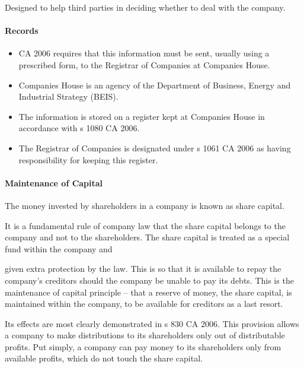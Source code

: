 \documentclass[
]{article}
\newenvironment{Shaded}{}{}
\newcommand{\NormalTok}[1]{#1}
\providecommand{\tightlist}{%
  \setlength{\itemsep}{0pt}\setlength{\parskip}{0pt}}
\begin{document}
Designed to help third parties in deciding whether to deal with the
company.

\hypertarget{records}{%
\paragraph{Records}\label{records}}

\begin{itemize}
\tightlist
\item
  CA 2006 requires that this information must be sent, usually using a
  prescribed form, to the Registrar of Companies at Companies House.
\item
  Companies House is an agency of the Department of Business, Energy and
  Industrial Strategy (BEIS).
\item
  The information is stored on a register kept at Companies House in
  accordance with s 1080 CA 2006.
\item
  The Registrar of Companies is designated under s 1061 CA 2006 as
  having responsibility for keeping this register.
\end{itemize}

\hypertarget{maintenance-of-capital}{%
\paragraph{Maintenance of Capital}\label{maintenance-of-capital}}

\begin{Shaded}
\begin{Highlighting}[]
\NormalTok{The money invested by shareholders in a company is known as share capital.}
\end{Highlighting}
\end{Shaded}

It is a fundamental rule of company law that the share capital belongs
to the company and not to the shareholders. The share capital is treated
as a special fund within the company and

given extra protection by the law. This is so that it is available to
repay the company's creditors should the company be unable to pay its
debts. This is the maintenance of capital principle -- that a reserve of
money, the share capital, is maintained within the company, to be
available for creditors as a last resort.

Its effects are most clearly demonstrated in s 830 CA 2006. This
provision allows a company to make distributions to its shareholders
only out of distributable profits. Put simply, a company can pay money
to its shareholders only from available profits, which do not touch the
share capital.
\end{document}
